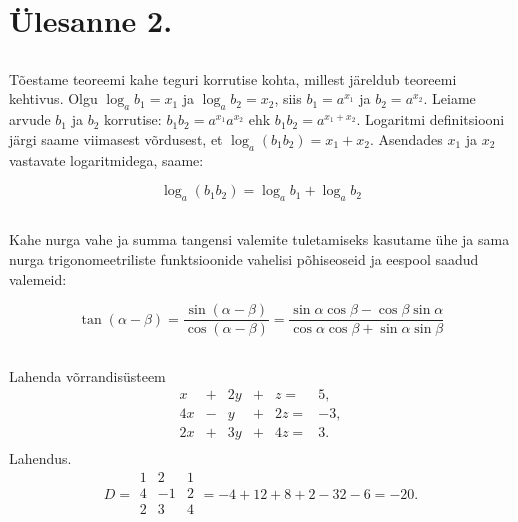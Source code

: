 \section{Ülesanne 2.}

\subsection*{}

Tõestame teoreemi kahe teguri korrutise kohta, millest järeldub teoreemi kehtivus.
Olgu $\log_a b_1 = x_1$ ja $\log_a b_2 = x_2$, siis $b_1 = a^{x_1}$ ja $b_2 = a^{x_2}$. Leiame arvude $b_1$ ja $b_2$ korrutise: $b_1 b_2 = a^{x_1} a^{x_2}$ ehk $b_1 b_2 = a^{x_1 + x_2}$. Logaritmi definitsiooni järgi saame viimasest võrdusest, et $\log_a(b_1 b_2) = x_1 + x_2$. Asendades $x_1$ ja $x_2$ vastavate logaritmidega, saame:

\begin{equation}
	\log_a(b_1 b_2) = \log_a b_1 + \log_a b_2
\end{equation}

\subsection*{}

Kahe nurga vahe ja summa tangensi valemite tuletamiseks kasutame ühe ja sama nurga trigonomeetriliste funktsioonide vahelisi põhiseoseid ja eespool saadud valemeid:

\begin{equation}
	\tan(\alpha	- \beta)
		= \frac{\sin(\alpha	- \beta)}{\cos(\alpha	- \beta)}
		= \frac{\sin\alpha\cos\beta - \cos\beta\sin\alpha}
					 {\cos\alpha\cos\beta + \sin\alpha\sin\beta}
\end{equation}

\subsection*{}

Lahenda võrrandisüsteem
\begin{equation}
  \begin{array}{*{7}{r}}
    x  & + & 2y & + &  z = &  5, \\
    4x & - &  y & + & 2z = & -3, \\
    2x & + & 3y & + & 4z = &  3. \\
  \end{array}
\end{equation}
Lahendus.
\begin{equation}
	D = 
	\begin{array}{|*{3}{r}|}
	1 & 2 & 1 \\
	4 & -1 & 2 \\
	2 & 3 & 4 \\
	\end{array}
	= -4 +12 +8 +2 -32 -6 = -20.
\end{equation}
